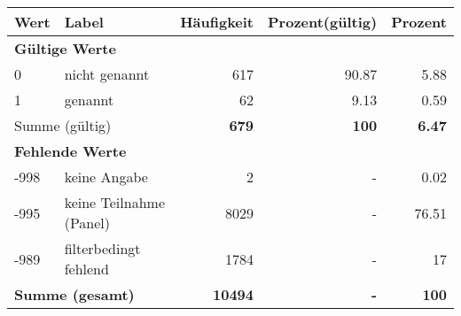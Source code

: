      \begin{longtable}{lXrrr}
     \toprule
     \textbf{Wert} & \textbf{Label} & \textbf{Häufigkeit} & \textbf{Prozent(gültig)} & \textbf{Prozent} \\
     \endhead
     \midrule
     \multicolumn{5}{l}{\textbf{Gültige Werte}}\\

     0 &
     \multicolumn{1}{X}{ nicht genannt   } &


       \num{617} &
       \num[round-mode=places,round-precision=2]{90,87} &
         \num[round-mode=places,round-precision=2]{5,88} \\

     1 &
     \multicolumn{1}{X}{ genannt   } &


       \num{62} &
       \num[round-mode=places,round-precision=2]{9,13} &
         \num[round-mode=places,round-precision=2]{0,59} \\
     \midrule
     \multicolumn{2}{l}{Summe (gültig)} &
       \textbf{\num{679}} &
     \textbf{100} &
       \textbf{\num[round-mode=places,round-precision=2]{6,47}} \\
     \multicolumn{5}{l}{\textbf{Fehlende Werte}}\\
       -998 &
       keine Angabe &
         \num{2} &
        - &
         \num[round-mode=places,round-precision=2]{0,02} \\
       -995 &
       keine Teilnahme (Panel) &
         \num{8029} &
        - &
         \num[round-mode=places,round-precision=2]{76,51} \\
       -989 &
       filterbedingt fehlend &
         \num{1784} &
        - &
         \num[round-mode=places,round-precision=2]{17} \\
     \midrule
     \multicolumn{2}{l}{\textbf{Summe (gesamt)}} &
          \textbf{\num{10494}} &
        \textbf{-} &
        \textbf{100} \\
     \bottomrule
     \end{longtable}
     

